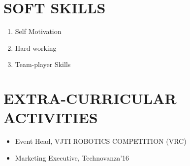 \documentclass[11pt,a4paper,sans]{moderncv}
\begin{document}
	\section{SOFT SKILLS}
	\begin{enumerate}
		\item {Self Motivation}
		\item {Hard working}
		\item {Team-player Skills}
		
	\end{enumerate}
	\section{EXTRA-CURRICULAR ACTIVITIES}
	\begin{itemize}
		\item {Event Head, VJTI ROBOTICS COMPETITION (VRC)}
		\item {Marketing Executive, Technovanza'16}
	\end{itemize}
\end{document}
